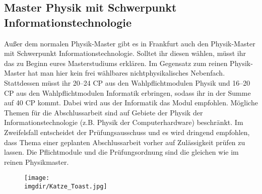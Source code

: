 \subsection{Master Physik mit Schwerpunkt Informationstechnologie}
\label{subsec:studienstruktur_schwerpunkt_it_msc}
Au\ss er dem normalen Physik-Master gibt es in Frankfurt auch den Physik-Master mit Schwerpunkt Informationstechnologie. Solltet ihr diesen wählen, müsst ihr das zu Beginn eures Masterstudiums erklären. Im Gegensatz zum reinen Physik-Master hat man hier kein frei wählbares nichtphysikalisches Nebenfach. Stattdessen müsst ihr 20--24 CP aus den Wahlpflichtmodulen Physik und 16--20 CP aus den Wahlpflichtmodulen Informatik erbringen, sodass ihr in der Summe auf 40 CP kommt. Dabei wird aus der Informatik das Modul  empfohlen. Mögliche Themen für die Abschlussarbeit sind auf Gebiete der Physik der Informationstechnologie (z.B. Physik der Computerhardware) beschränkt. Im Zweifelsfall entscheidet der Prüfungsausschuss und es wird dringend empfohlen, dass Thema einer geplanten Abschlussarbeit vorher auf Zulässigkeit prüfen zu lassen. Die Pflichtmodule und die Prüfungsordnung sind die gleichen wie im reinen Physikmaster.
\begin{figure}
  \centering
  \texttt{[image: \\imgdir/Katze\_Toast.jpg]}
\end{figure}
